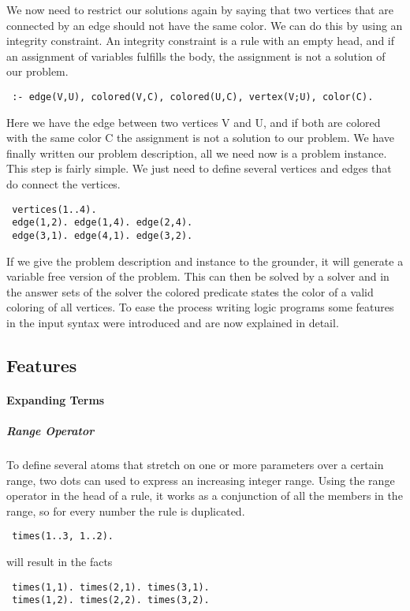 \documentclass[a4paper,10pt]{article}
\begin{document}
We now need to restrict our solutions again by saying that two vertices that are connected by an edge should not have the same color.
We can do this by using an integrity constraint.
An integrity constraint is a rule with an empty head, and if an assignment of variables fulfills the body, the assignment is not a solution of our problem.
\begin{verbatim}
 :- edge(V,U), colored(V,C), colored(U,C), vertex(V;U), color(C).
\end{verbatim}
Here we have the edge between two vertices V and U, and if both are colored with the same color C the assignment is not a solution to our problem.
\newline
We have finally written our problem description, all we need now is a problem instance. This step is fairly simple.
We just need to define several vertices and edges that do connect the vertices.
\begin{verbatim}
 vertices(1..4).
 edge(1,2). edge(1,4). edge(2,4).
 edge(3,1). edge(4,1). edge(3,2).
\end{verbatim}

If we give the problem description and instance to the grounder, it will generate a variable free version of the problem. This can then be solved by a solver and in the answer sets of the solver the colored predicate states the color of a valid coloring of all vertices.
\newline
To ease the process writing logic programs some features in the input syntax were introduced and are now explained in detail.
\subsection{Features}
\paragraph{Expanding Terms}
\subparagraph{Range Operator}
To define several atoms that stretch on one or more parameters over a certain range, two dots can used to express an increasing integer range.
Using the range operator in the head of a rule, it works as a conjunction of all the members in the range, so for every number the rule is duplicated.
\begin{verbatim}
 times(1..3, 1..2).
\end{verbatim}
will result in the facts
\begin{verbatim}
 times(1,1). times(2,1). times(3,1).
 times(1,2). times(2,2). times(3,2).
\end{verbatim}
\end{document}
